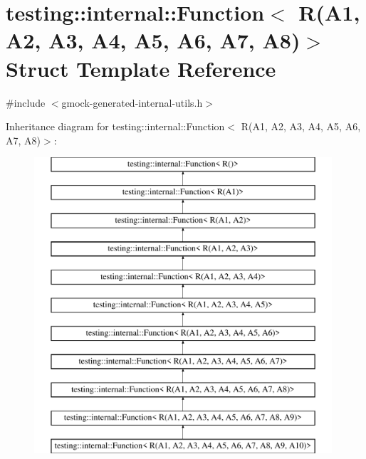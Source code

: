 \hypertarget{structtesting_1_1internal_1_1Function_3_01R_07A1_00_01A2_00_01A3_00_01A4_00_01A5_00_01A6_00_01A7_00_01A8_08_4}{}\section{testing\+::internal\+::Function$<$ R(A1, A2, A3, A4, A5, A6, A7, A8)$>$ Struct Template Reference}
\label{structtesting_1_1internal_1_1Function_3_01R_07A1_00_01A2_00_01A3_00_01A4_00_01A5_00_01A6_00_01A7_00_01A8_08_4}


{\ttfamily \#include $<$gmock-\/generated-\/internal-\/utils.\+h$>$}

Inheritance diagram for testing\+::internal\+::Function$<$ R(A1, A2, A3, A4, A5, A6, A7, A8)$>$\+:\begin{figure}[H]
\begin{center}
\leavevmode
\includegraphics[height=11.000000cm]{structtesting_1_1internal_1_1Function_3_01R_07A1_00_01A2_00_01A3_00_01A4_00_01A5_00_01A6_00_01A7_00_01A8_08_4}
\end{center}
\end{figure}
